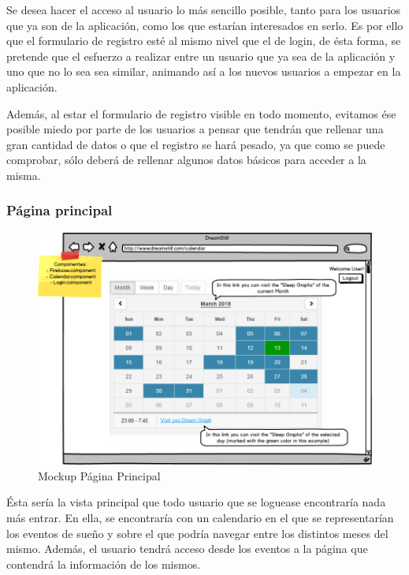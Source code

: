 \documentclass[11pt,openany]{book}
\begin{document}
Se desea hacer el acceso al usuario lo más sencillo posible, tanto para los usuarios que ya son de la aplicación, como los que estarían interesados en serlo. Es por ello que el formulario de registro esté al mismo nivel que el de login, de ésta forma, se pretende que el esfuerzo a realizar entre un usuario que ya sea de la aplicación y uno que no lo sea sea similar, animando así a los nuevos usuarios a empezar en la aplicación. 

Además, al estar el formulario de registro visible en todo momento, evitamos ése posible miedo por parte de los usuarios a pensar que tendrán que rellenar una gran cantidad de datos o que el registro se hará pesado, ya que como se puede comprobar, sólo deberá de rellenar algunos datos básicos para acceder a la misma.

\subsubsection{Página principal}

\begin{figure}[H]
\centering
\includegraphics[totalheight=6.5cm]{mockups/CalendarPage.png}
\caption{Mockup Página Principal}
\end{figure}
\par\bigskip 
\noindent

Ésta sería la vista principal que todo usuario que se loguease encontraría nada más entrar. En ella, se encontraría con un calendario en el que se representarían los eventos de sueño y sobre el que podría navegar entre los distintos meses del mismo. Además, el usuario tendrá acceso desde los eventos a la página que contendrá la información de los mismos.
\end{document}
